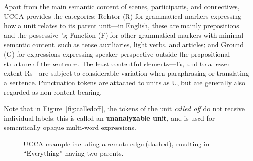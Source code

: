 \documentclass[12pt,a4paper,table]{report}
\begin{document}
Apart from the main semantic content of scenes, participants, and connectives, UCCA provides the categories: Relator (R) for grammatical markers expressing how a unit relates to its parent unit---in English, these are mainly prepositions and the possessive \textit{'s}; Function (F) for other grammatical markers with minimal semantic content, such as tense auxiliaries, light verbs, and articles; and Ground (G) for expressions expressing speaker perspective outside the propositional structure of the sentence.
The least contentful elements---Fs, and to a lesser extent Rs---are subject to considerable variation when paraphrasing or translating a sentence.
Punctuation tokens are attached to units as U, but are generally also regarded as non-content-bearing.

Note that in Figure~\ref{fig:calledoff}, the tokens of the unit \textit{called off} do not receive individual labels: this is called an \textbf{unanalyzable unit}, and is used for semantically opaque multi-word expressions.

\begin{figure}[ht]\small\centering
\caption{
    UCCA example including a remote edge (dashed),
    resulting in ``Everything'' having two parents.}\label{fig:remote}
\end{figure}
\end{document}
